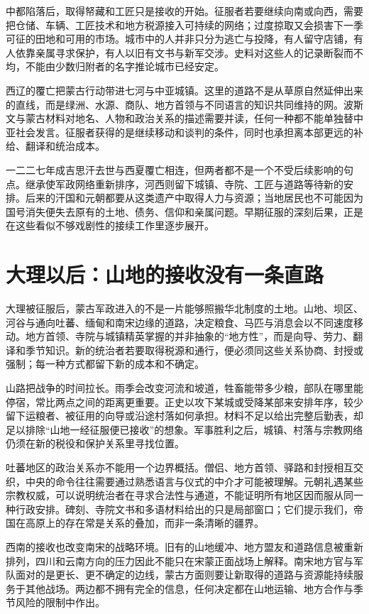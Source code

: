 中都陷落后，取得帑藏和工匠只是接收的开始。征服者若要继续向南或向西，需要把仓储、车辆、工匠技术和地方税源接入可持续的网络；过度掠取又会损害下一季可征的田地和可用的市场。城市中的人并非只分为逃亡与投降，有人留守店铺，有人依靠亲属寻求保护，有人以旧有文书与新军交涉。史料对这些人的记录断裂而不均，不能由少数归附者的名字推论城市已经安定。

西辽的覆亡把蒙古行动带进七河与中亚城镇。这里的道路不是从草原自然延伸出来的直线，而是绿洲、水源、商队、地方首领与不同语言的知识共同维持的网。波斯文与蒙古材料对地名、人物和政治关系的描述需要并读，任何一种都不能单独替中亚社会发言。征服者获得的是继续移动和谈判的条件，同时也承担离本部更远的补给、翻译和统治成本。

一二二七年成吉思汗去世与西夏覆亡相连，但两者都不是一个不受后续影响的句点。继承使军政网络重新排序，河西则留下城镇、寺院、工匠与道路等待新的安排。后来的汗国和元朝都要从这类遗产中取得人力与资源；当地居民也不可能因为国号消失便失去原有的土地、债务、信仰和亲属问题。早期征服的深刻后果，正是在这些看似不够戏剧性的接续工作里逐步展开。

\section{大理以后：山地的接收没有一条直路}

大理被征服后，蒙古军政进入的不是一片能够照搬华北制度的土地。山地、坝区、河谷与通向吐蕃、缅甸和南宋边缘的道路，决定粮食、马匹与消息会以不同速度移动。地方首领、寺院与城镇精英掌握的并非抽象的“地方性”，而是向导、劳力、翻译和季节知识。新的统治者若要取得税源和通行，便必须同这些关系协商、封授或强制；每一种方式都留下新的成本和不确定。

山路把战争的时间拉长。雨季会改变河流和坡道，牲畜能带多少粮，部队在哪里能停宿，常比两点之间的距离更重要。正史以攻下某城或受降某部来安排年序，较少留下运粮者、被征用的向导或沿途村落如何承担。材料不足以给出完整后勤表，却足以排除“山地一经征服便已接收”的想象。军事胜利之后，城镇、村落与宗教网络仍须在新的税役和保护关系里寻找位置。

吐蕃地区的政治关系亦不能用一个边界概括。僧侣、地方首领、驿路和封授相互交织，中央的命令往往需要通过熟悉语言与仪式的中介才可能被理解。元朝礼遇某些宗教权威，可以说明统治者在寻求合法性与通道，不能证明所有地区因而服从同一种行政安排。碑刻、寺院文书和多语材料给出的只是局部窗口；它们提示我们，帝国在高原上的存在常是关系的叠加，而非一条清晰的疆界。

西南的接收也改变南宋的战略环境。旧有的山地缓冲、地方盟友和道路信息被重新排列，四川和云南方向的压力因此不能只在宋蒙正面战场上解释。南宋地方官与军队面对的是更长、更不确定的边线，蒙古方面则要让新取得的道路与资源能持续服务于其他战场。两边都不拥有完全的信息，任何决定都在山地运输、地方合作与季节风险的限制中作出。

